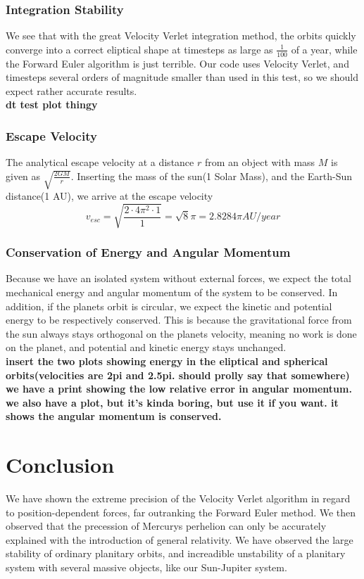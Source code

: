 \documentclass[a4paper]{article}
\begin{document}
\subsubsection{Integration Stability}
We see that with the great Velocity Verlet integration method, the orbits quickly converge into a correct eliptical shape at timesteps as large as $\frac{1}{100}$ of a year, while the Forward Euler algorithm is just terrible. Our code uses Velocity Verlet, and timesteps several orders of magnitude smaller than used in this test, so we should expect rather accurate results.\\
\textbf{dt test plot thingy}
\subsubsection{Escape Velocity}
The analytical escape velocity at a distance $r$ from an object with mass $M$ is given as $\sqrt{\frac{2GM}{r}}$. Inserting the mass of the sun(1 Solar Mass), and the Earth-Sun distance(1 AU), we arrive at the escape velocity
\begin{equation}
v_{esc} = \sqrt{\frac{2\cdot 4\pi^2 \cdot 1}{1}} = \sqrt{8}\pi = 2.8284\pi AU/year
\end{equation}
\subsubsection{Conservation of Energy and Angular Momentum}
Because we have an isolated system without external forces, we expect the total mechanical energy and angular momentum of the system to be conserved. In addition, if the planets orbit is circular, we expect the kinetic and potential energy to be respectively conserved. This is because the gravitational force from the sun always stays orthogonal on the planets velocity, meaning no work is done on the planet, and potential and kinetic energy stays unchanged.\\
\textbf{insert the two plots showing energy in the eliptical and spherical orbits(velocities are 2pi and 2.5pi. should prolly say that somewhere)}\\
\textbf{we have a print showing the low relative error in angular momentum. we also have a plot, but it's kinda boring, but use it if you want. it shows the angular momentum is conserved.}

\section{Conclusion}\label{sec:conclusion}
We have shown the extreme precision of the Velocity Verlet algorithm in regard to position-dependent forces, far outranking the Forward Euler method.
We then observed that the precession of Mercurys perhelion can only be accurately explained with the introduction of general relativity.
We have observed the large stability of ordinary planitary orbits, and increadible unstability of a planitary system with several massive objects, like our Sun-Jupiter system.

%
%

{}
\end{document}
